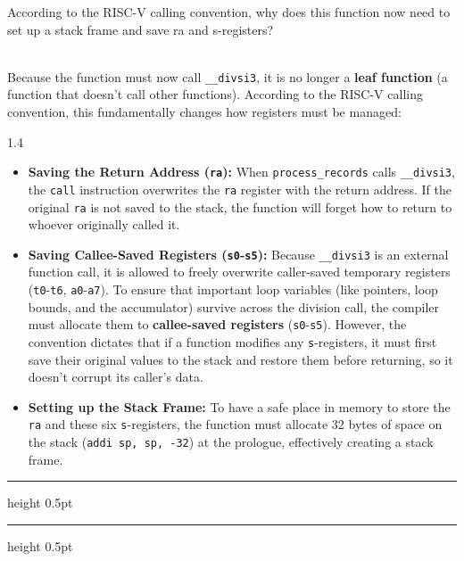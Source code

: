\documentclass[12pt, a4paper]{article}
\begin{document}
\noindent\hrulefill

\vspace{0.3cm}
\noindent
According to the RISC-V calling convention, why does this function now need to set up a stack frame and save
ra and s-registers?

\vspace{0.3cm}
\noindent{}\\
Because the function must now call \texttt{\_\_divsi3}, it is no longer a \textbf{leaf function} (a function that doesn't call other functions). According to the RISC-V calling convention, this fundamentally changes how registers must be managed:

\begin{spacing}{1.4}
\begin{itemize}[leftmargin=*]
    \item \textbf{Saving the Return Address (\texttt{ra}):} When \texttt{process\_records} calls \texttt{\_\_divsi3}, the \texttt{call} instruction overwrites the \texttt{ra} register with the return address. If the original \texttt{ra} is not saved to the stack, the function will forget how to return to whoever originally called it.
    \item \textbf{Saving Callee-Saved Registers (\texttt{s0}-\texttt{s5}):} Because \texttt{\_\_divsi3} is an external function call, it is allowed to freely overwrite caller-saved temporary registers (\texttt{t0}-\texttt{t6}, \texttt{a0}-\texttt{a7}). To ensure that important loop variables (like pointers, loop bounds, and the accumulator) survive across the division call, the compiler must allocate them to \textbf{callee-saved registers} (\texttt{s0}-\texttt{s5}). However, the convention dictates that if a function modifies any \texttt{s}-registers, it must first save their original values to the stack and restore them before returning, so it doesn't corrupt its caller's data.
    \item \textbf{Setting up the Stack Frame:} To have a safe place in memory to store the \texttt{ra} and these six \texttt{s}-registers, the function must allocate 32 bytes of space on the stack (\texttt{addi sp, sp, -32}) at the prologue, effectively creating a stack frame.
\end{itemize}
\end{spacing}

\vspace{5pt}
\hrule height 0.5pt
\vspace{2pt}
\hrule height 0.5pt
\vspace{5pt}
\end{document}
